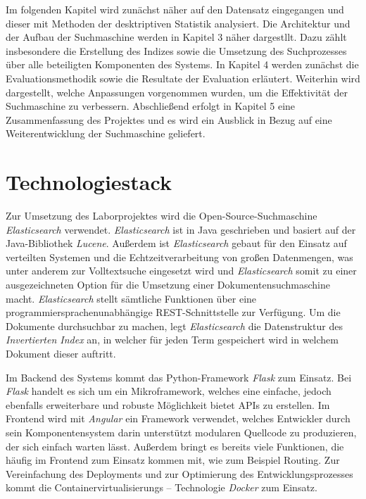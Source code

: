 \documentclass[11pt,a4paper, halfparskip]{scrartcl}
\begin{document}
Im folgenden Kapitel wird zunächst näher auf den Datensatz eingegangen und dieser mit Methoden der desktriptiven Statistik analysiert.
Die Architektur und der Aufbau der Suchmaschine werden in Kapitel 3 näher dargestllt. 
Dazu zählt insbesondere die Erstellung des Indizes sowie die Umsetzung des Suchprozesses über alle beteiligten Komponenten des Systems.
In Kapitel 4 werden zunächst die Evaluationsmethodik sowie die Resultate der Evaluation erläutert.
Weiterhin wird dargestellt, welche Anpassungen vorgenommen wurden, um die Effektivität der Suchmaschine zu verbessern.
Abschließend erfolgt in Kapitel 5 eine Zusammenfassung des Projektes und es wird ein Ausblick in Bezug auf eine Weiterentwicklung der Suchmaschine geliefert.

\section{Technologiestack}

Zur Umsetzung des Laborprojektes wird die Open-Source-Suchmaschine \textit{Elasticsearch} verwendet. 
\textit{Elasticsearch} ist in Java geschrieben und basiert auf der Java-Bibliothek \textit{Lucene}. 
Außerdem ist \textit{Elasticsearch} gebaut für den Einsatz auf verteilten Systemen und die Echtzeitverarbeitung von großen Datenmengen, was unter anderem zur Volltextsuche eingesetzt wird und \textit{Elasticsearch} somit zu einer ausgezeichneten Option für die Umsetzung einer Dokumentensuchmaschine macht.
\textit{Elasticsearch} stellt sämtliche Funktionen über eine programmiersprachenunabhängige REST-Schnittstelle zur Verfügung.
Um die Dokumente durchsuchbar zu machen, legt \textit{Elasticsearch} die Datenstruktur des \textit{Invertierten Index} an, in welcher für jeden Term gespeichert wird in welchem Dokument dieser auftritt.

Im Backend des Systems kommt das Python-Framework \textit{Flask} zum Einsatz. 
Bei \textit{Flask} handelt es sich um ein Mikroframework, welches eine einfache, jedoch ebenfalls erweiterbare und robuste Möglichkeit bietet APIs zu erstellen.
Im Frontend wird mit \textit{Angular} ein Framework verwendet, welches Entwickler durch sein Komponentensystem darin unterstützt modularen Quellcode zu produzieren, der sich einfach warten lässt.
Außerdem bringt es bereits viele Funktionen, die häufig im Frontend zum Einsatz kommen mit, wie zum Beispiel Routing. 
Zur Vereinfachung des Deployments und zur Optimierung des Entwicklungsprozesses kommt die Containervirtualisierungs – Technologie \textit{Docker} zum Einsatz.
\end{document}
